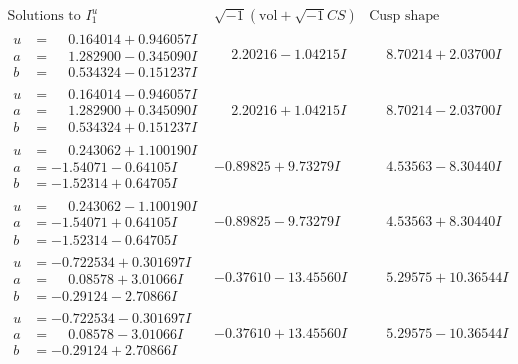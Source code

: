 \documentclass[1p]{elsarticle_modified}
\theoremstyle{definition}
\newcommand{\I}{\sqrt{-1}}
\begin{document}
$$\begin{array}{c|c|c}  
\text{Solutions to }I^u_{1}& \I (\text{vol} + \sqrt{-1}CS) & \text{Cusp shape}\\
 \hline 
\begin{aligned}
u &= \phantom{-}0.164014 + 0.946057 I \\
a &= \phantom{-}1.282900 - 0.345090 I \\
b &= \phantom{-}0.534324 - 0.151237 I\end{aligned}
 & \phantom{-}2.20216 - 1.04215 I & \phantom{-}8.70214 + 2.03700 I \\ \hline\begin{aligned}
u &= \phantom{-}0.164014 - 0.946057 I \\
a &= \phantom{-}1.282900 + 0.345090 I \\
b &= \phantom{-}0.534324 + 0.151237 I\end{aligned}
 & \phantom{-}2.20216 + 1.04215 I & \phantom{-}8.70214 - 2.03700 I \\ \hline\begin{aligned}
u &= \phantom{-}0.243062 + 1.100190 I \\
a &= -1.54071 - 0.64105 I \\
b &= -1.52314 + 0.64705 I\end{aligned}
 & -0.89825 + 9.73279 I & \phantom{-}4.53563 - 8.30440 I \\ \hline\begin{aligned}
u &= \phantom{-}0.243062 - 1.100190 I \\
a &= -1.54071 + 0.64105 I \\
b &= -1.52314 - 0.64705 I\end{aligned}
 & -0.89825 - 9.73279 I & \phantom{-}4.53563 + 8.30440 I \\ \hline\begin{aligned}
u &= -0.722534 + 0.301697 I \\
a &= \phantom{-}0.08578 + 3.01066 I \\
b &= -0.29124 - 2.70866 I\end{aligned}
 & -0.37610 - 13.45560 I & \phantom{-}5.29575 + 10.36544 I \\ \hline\begin{aligned}
u &= -0.722534 - 0.301697 I \\
a &= \phantom{-}0.08578 - 3.01066 I \\
b &= -0.29124 + 2.70866 I\end{aligned}
 & -0.37610 + 13.45560 I & \phantom{-}5.29575 - 10.36544 I \\ \hline\begin{aligned}

\end{aligned}
\end{array}$$
\end{document}
